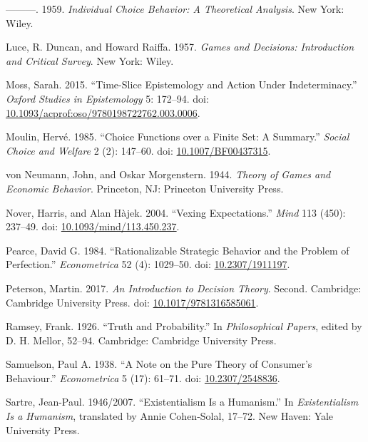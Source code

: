\documentclass[
  11pt,
  letterpaper,
  DIV=11,
  numbers=noendperiod,
  twoside]{scrartcl}
\newlength{\cslhangindent}
\newenvironment{CSLReferences}[2] %
 {\begin{list}{}{%
  \setlength{\itemindent}{0pt}
  \setlength{\leftmargin}{0pt}
  \setlength{\parsep}{0pt}
  \ifodd #1
   \setlength{\leftmargin}{\cslhangindent}
   \setlength{\itemindent}{-1\cslhangindent}
  \fi
  \setlength{\itemsep}{#2\baselineskip}}}
 {\end{list}}
\begin{document}
\begin{CSLReferences}{1}{0}
---------. 1959. \emph{Individual Choice Behavior: A Theoretical
Analysis}. New York: Wiley.

Luce, R. Duncan, and Howard Raiffa. 1957. \emph{Games and Decisions:
Introduction and Critical Survey}. New York: Wiley.

Moss, Sarah. 2015. {``Time-Slice Epistemology and Action Under
Indeterminacy.''} \emph{Oxford Studies in Epistemology} 5: 172--94. doi:
\href{https://doi.org/10.1093/acprof:oso/9780198722762.003.0006}{10.1093/acprof:oso/9780198722762.003.0006}.

Moulin, Hervé. 1985. {``Choice Functions over a Finite Set: A
Summary.''} \emph{Social Choice and Welfare} 2 (2): 147--60. doi:
\href{https://doi.org/10.1007/BF00437315}{10.1007/BF00437315}.

von Neumann, John, and Oskar Morgenstern. 1944. \emph{Theory of Games
and Economic Behavior}. Princeton, NJ: Princeton University Press.

Nover, Harris, and Alan Hàjek. 2004. {``Vexing Expectations.''}
\emph{Mind} 113 (450): 237--49. doi:
\href{https://doi.org/10.1093/mind/113.450.237}{10.1093/mind/113.450.237}.

Pearce, David G. 1984. {``Rationalizable Strategic Behavior and the
Problem of Perfection.''} \emph{Econometrica} 52 (4): 1029--50. doi:
\href{https://doi.org/10.2307/1911197}{10.2307/1911197}.

Peterson, Martin. 2017. \emph{An Introduction to Decision Theory}.
Second. Cambridge: Cambridge University Press. doi:
\href{https://doi.org/10.1017/9781316585061}{10.1017/9781316585061}.

Ramsey, Frank. 1926. {``Truth and Probability.''} In \emph{Philosophical
Papers}, edited by D. H. Mellor, 52--94. Cambridge: Cambridge University
Press.

Samuelson, Paul A. 1938. {``A Note on the Pure Theory of Consumer's
Behaviour.''} \emph{Econometrica} 5 (17): 61--71. doi:
\href{https://doi.org/10.2307/2548836}{10.2307/2548836}.

Sartre, Jean-Paul. 1946/2007. {``Existentialism Is a Humanism.''} In
\emph{Existentialism Is a Humanism}, translated by Annie Cohen-Solal,
17--72. New Haven: Yale University Press.


\end{CSLReferences}
\end{document}

